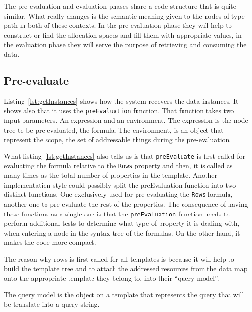 The pre-evaluation and evaluation phases share a code structure that is quite similar. What really changes is the semantic meaning given to the nodes of type path in both of these contexts. In the pre-evaluation phase they will help to construct or find the allocation spaces and fill them with appropriate values, in the evaluation phase they will serve the purpose of retrieving and consuming the data.

\subsection{Pre-evaluate}
\label{sec:PreEvaluate}



Listing~\ref{lst:getInstances} shows how the system recovers the data instances. It shows also that it uses the \texttt{preEvaluation} function. That function takes two input parameters. An expression and an environment. The expression is the node tree to be pre-evaluated, the formula. The environment, is an object that represent the scope, the set of addressable things during the pre-evaluation.

What listing~\ref{lst:getInstances} also tells us is that \texttt{{preEvaluate}} is first called for evaluating the formula relative to the \texttt{Rows} property and then, it is called as many times as the total number of properties in the template. Another implementation style could possibly split the preEvaluation function into two distinct functions. One exclusively used for pre-evaluating the \texttt{Rows} formula, another one to pre-evaluate the rest of the properties. The consequence of having these functions as a single one is that the \texttt{preEvaluation} function needs to perform additional tests to determine what type of property it is dealing with, when entering a node in the syntax tree of the formulas. On the other hand, it makes the code more compact.

The reason why rows is first called for all templates is because it will help to build the template tree and to attach the addressed resources from the data map onto the appropriate template they belong to, into their ``query model''.

The query model is the object on a template that represents the query that will be translate into a query string.

